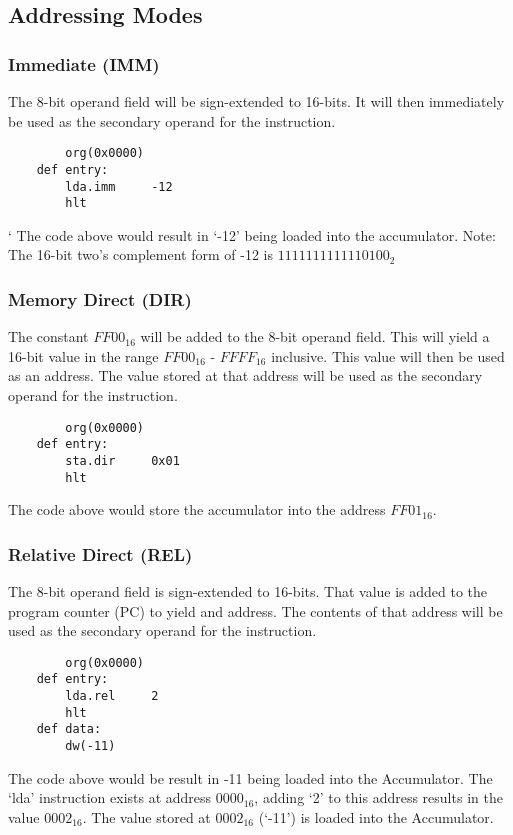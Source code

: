 \subsection{Addressing Modes}\label{subsec:addressing-modes}

\subsubsection{Immediate (IMM)}
\par The 8-bit operand field will be sign-extended to 16-bits.
It will then immediately be used as the secondary operand for the instruction.
\begin{verbatim}
        org(0x0000)
    def entry:
        lda.imm     -12
        hlt
\end{verbatim}`
The code above would result in `-12' being loaded into the accumulator.
Note: The 16-bit two's complement form of -12 is $1111111111110100_{2}$

\subsubsection{Memory Direct (DIR)}
\par The constant $FF00_{16}$ will be added to the 8-bit operand field.
This will yield a 16-bit value in the range $FF00_{16}$ - $FFFF_{16}$ inclusive.
This value will then be used as an address.
The value stored at that address will be used as the secondary operand for the instruction.
\begin{verbatim}
        org(0x0000)
    def entry:
        sta.dir     0x01
        hlt
\end{verbatim}
The code above would store the accumulator into the address $FF01_{16}$.

\subsubsection{Relative Direct (REL)}\label{subsec:relative-direct-(rel)}
\par The 8-bit operand field is sign-extended to 16-bits.
That value is added to the program counter (PC) to yield and address.
The contents of that address will be used as the secondary operand for the instruction.
\begin{verbatim}
        org(0x0000)
    def entry:
        lda.rel     2
        hlt
    def data:
        dw(-11)
\end{verbatim}
The code above would be result in -11 being loaded into the Accumulator.
The `lda' instruction exists at address $0000_{16}$, adding `2' to this address results in the value $0002_{16}$.
The value stored at $0002_{16}$ (`-11') is loaded into the Accumulator.

